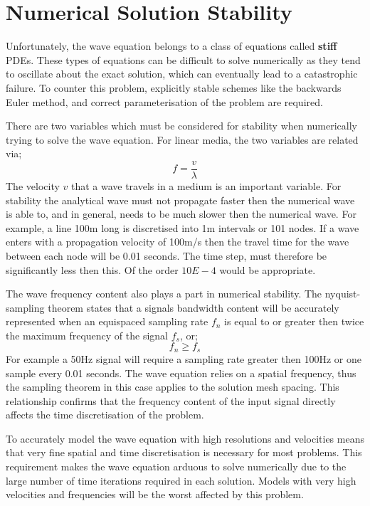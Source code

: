 \section{Numerical Solution Stability} \label{sec:nsstab}
Unfortunately, the wave equation belongs to a class of equations called
\textbf{stiff} PDEs. These types of equations can be difficult to solve
numerically as they tend to oscillate about the exact solution, which can
eventually lead to a catastrophic failure. To counter this problem, explicitly
stable schemes like the backwards Euler method, and correct parameterisation of
the problem are required. 

There are two variables which must be considered for
stability when numerically trying to solve the wave equation. For linear media,
the two variables are related via;
\begin{equation} \label{eqn:freqvel}
f=\frac{v}{\lambda}
\end{equation}
The velocity $v$ that a wave travels in a medium is an important variable. For
stability the analytical wave must not propagate faster then the numerical wave
is able to, and in general, needs to be much slower then the numerical wave.
For example, a line 100m long is discretised into 1m intervals or 101 nodes. If
a wave enters with a propagation velocity of 100m/s then the travel time for
the wave between each node will be 0.01 seconds. The time step, must therefore
be significantly less then this. Of the order $10E-4$ would be appropriate. 

The wave frequency content also plays a part in numerical stability. The
nyquist-sampling theorem states that a signals bandwidth content will be
accurately represented when an equispaced sampling rate $f _{n}$ is
equal to or greater then twice the maximum frequency of the signal
$f_{s}$, or;
\begin{equation} \label{eqn:samptheorem}
 f_{n} \geqslant f_{s}
\end{equation}
For example a 50Hz signal will require a sampling rate greater then 100Hz or
one sample every 0.01 seconds. The wave equation relies on a spatial frequency,
thus the sampling theorem in this case applies to the solution mesh spacing.
This relationship confirms that the frequency content of the input signal
directly affects the time discretisation of the problem.

To accurately model the wave equation with high resolutions and velocities
means that very fine spatial and time discretisation is necessary for most
problems.
This requirement makes the wave equation arduous to
solve numerically due to the large number of time iterations required in each
solution. Models with very high velocities and frequencies will be the worst
affected by this problem.

